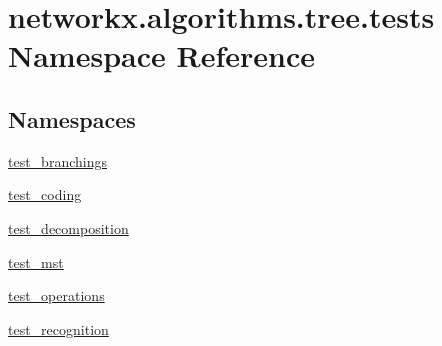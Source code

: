 \hypertarget{namespacenetworkx_1_1algorithms_1_1tree_1_1tests}{}\section{networkx.\+algorithms.\+tree.\+tests Namespace Reference}
\label{namespacenetworkx_1_1algorithms_1_1tree_1_1tests}
\subsection*{Namespaces}
\begin{DoxyCompactItemize}
\item 
 \hyperlink{namespacenetworkx_1_1algorithms_1_1tree_1_1tests_1_1test__branchings}{test\+\_\+branchings}
\item 
 \hyperlink{namespacenetworkx_1_1algorithms_1_1tree_1_1tests_1_1test__coding}{test\+\_\+coding}
\item 
 \hyperlink{namespacenetworkx_1_1algorithms_1_1tree_1_1tests_1_1test__decomposition}{test\+\_\+decomposition}
\item 
 \hyperlink{namespacenetworkx_1_1algorithms_1_1tree_1_1tests_1_1test__mst}{test\+\_\+mst}
\item 
 \hyperlink{namespacenetworkx_1_1algorithms_1_1tree_1_1tests_1_1test__operations}{test\+\_\+operations}
\item 
 \hyperlink{namespacenetworkx_1_1algorithms_1_1tree_1_1tests_1_1test__recognition}{test\+\_\+recognition}
\end{DoxyCompactItemize}
